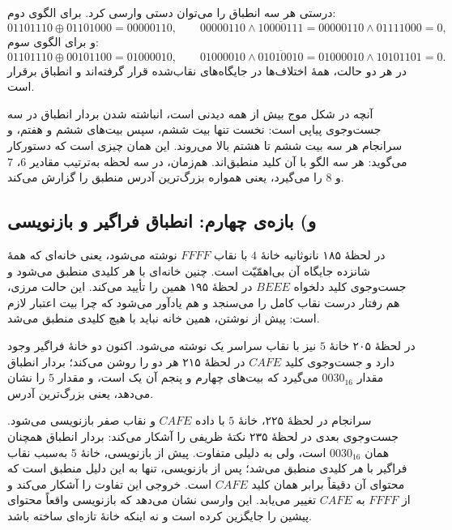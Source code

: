 \documentclass[12pt,a4paper]{article}
\begin{document}
	درستی هر سه انطباق را می‌توان دستی وارسی کرد. برای الگوی دوم:
	\[
	01101110 \oplus 01101000 = 00000110,
	\qquad
	00000110 \wedge \overline{10000111} = 00000110 \wedge 01111000 = 0 ,
	\]
	و برای الگوی سوم:
	\[
	01101110 \oplus 00101100 = 01000010,
	\qquad
	01000010 \wedge \overline{01010010} = 01000010 \wedge 10101101 = 0 .
	\]
	در هر دو حالت، همهٔ اختلاف‌ها در جایگاه‌های نقاب‌شده قرار گرفته‌اند و انطباق برقرار است.

	آنچه در شکل موج بیش از همه دیدنی است، انباشته شدن بردار انطباق در سه جست‌وجوی پیاپی است: نخست تنها بیت ششم، سپس بیت‌های ششم و هفتم، و سرانجام هر سه بیت ششم تا هشتم بالا می‌روند. این همان چیزی است که دستورکار می‌گوید: هر سه الگو با آن کلید منطبق‌اند. هم‌زمان،  در سه لحظه به‌ترتیب مقادیر \(6\)، \(7\) و \(8\) را می‌گیرد، یعنی همواره بزرگ‌ترین آدرس منطبق را گزارش می‌کند.

	\subsection*{و) بازه‌ی چهارم: انطباق فراگیر و بازنویسی}

	در لحظهٔ ۱۸۵ نانوثانیه خانهٔ \(4\) با نقاب \(FFFF\) نوشته می‌شود، یعنی خانه‌ای که همهٔ شانزده جایگاه آن بی‌اهمّیّت است. چنین خانه‌ای با هر کلیدی منطبق می‌شود و جست‌وجوی کلید دلخواه \(BEEE\) در لحظهٔ ۱۹۵ همین را تأیید می‌کند. این حالت مرزی، هم رفتار درست نقاب کامل را می‌سنجد و هم یادآور می‌شود که چرا بیت اعتبار لازم است: پیش از نوشتن، همین خانه نباید با هیچ کلیدی منطبق می‌شد.

	در لحظهٔ ۲۰۵ خانهٔ \(5\) نیز با نقاب سراسر یک نوشته می‌شود. اکنون دو خانهٔ فراگیر وجود دارد و جست‌وجوی کلید \(CAFE\) در لحظهٔ ۲۱۵ هر دو را روشن می‌کند؛ بردار انطباق مقدار \(0030_{16}\) می‌گیرد که بیت‌های چهارم و پنجم آن یک است، و  مقدار \(5\) را نشان می‌دهد، یعنی بزرگ‌ترین آدرس.

	سرانجام در لحظهٔ ۲۲۵، خانهٔ \(5\) با داده \(CAFE\) و نقاب صفر بازنویسی می‌شود. جست‌وجوی بعدی در لحظهٔ ۲۳۵ نکتهٔ ظریفی را آشکار می‌کند: بردار انطباق همچنان همان \(0030_{16}\) است، ولی به دلیلی متفاوت. پیش از بازنویسی، خانهٔ \(5\) به‌سبب نقاب فراگیر با \emph{هر} کلیدی منطبق می‌شد؛ پس از بازنویسی، تنها به این دلیل منطبق است که محتوای آن دقیقاً برابر همان کلید \(CAFE\) است. خروجی  این تفاوت را آشکار می‌کند و از \(FFFF\) به \(CAFE\) تغییر می‌یابد. این وارسی نشان می‌دهد که بازنویسی واقعاً محتوای پیشین را جایگزین کرده است و نه اینکه خانهٔ تازه‌ای ساخته باشد.
\end{document}
